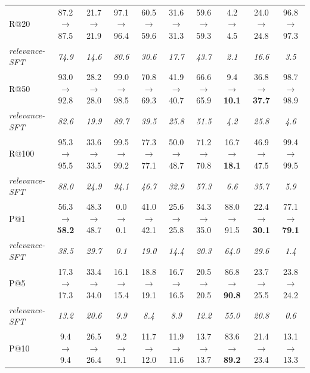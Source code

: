 \begin{table}[H]
{\begin{tabular}{lccccccccc}
R@20 & 87.2 $\rightarrow$ 87.5 & 21.7 $\rightarrow$ 21.9 & 97.1 $\rightarrow$ 96.4 & 60.5 $\rightarrow$ 59.6 & 31.6 $\rightarrow$ 31.3 & 59.6 $\rightarrow$ 59.3 & 4.2 $\rightarrow$ 4.5 & 24.0 $\rightarrow$ 24.8 & 96.8 $\rightarrow$ 97.3 \\
\quad \textit{relevance-SFT} & \textit{74.9} & \textit{14.6} & \textit{80.6} & \textit{30.6} & \textit{17.7} & \textit{43.7} & \textit{2.1} & \textit{16.6} & \textit{3.5} \\
R@50 & 93.0 $\rightarrow$ 92.8 & 28.2 $\rightarrow$ 28.0 & 99.0 $\rightarrow$ 98.5 & 70.8 $\rightarrow$ 69.3 & 41.9 $\rightarrow$ 40.7 & 66.6 $\rightarrow$ 65.9 & 9.4 $\rightarrow$ \textbf{10.1} & 36.8 $\rightarrow$ \textbf{37.7} & 98.7 $\rightarrow$ 98.9 \\
\quad \textit{relevance-SFT} & \textit{82.6} & \textit{19.9} & \textit{89.7} & \textit{39.5} & \textit{25.8} & \textit{51.5} & \textit{4.2} & \textit{25.8} & \textit{4.6} \\
R@100 & 95.3 $\rightarrow$ 95.5 & 33.6 $\rightarrow$ 33.5 & 99.5 $\rightarrow$ 99.2 & 77.3 $\rightarrow$ 77.1 & 50.0 $\rightarrow$ 48.7 & 71.2 $\rightarrow$ 70.8 & 16.7 $\rightarrow$ \textbf{18.1} & 46.9 $\rightarrow$ 47.5 & 99.4 $\rightarrow$ 99.5 \\
\quad \textit{relevance-SFT} & \textit{88.0} & \textit{24.9} & \textit{94.1} & \textit{46.7} & \textit{32.9} & \textit{57.3} & \textit{6.6} & \textit{35.7} & \textit{5.9} \\
P@1 & 56.3 $\rightarrow$ \textbf{58.2} & 48.3 $\rightarrow$ 48.7 & 0.0 $\rightarrow$ 0.1 & 41.0 $\rightarrow$ 42.1 & 25.6 $\rightarrow$ 25.8 & 34.3 $\rightarrow$ 35.0 & 88.0 $\rightarrow$ 91.5 & 22.4 $\rightarrow$ \textbf{30.1} & 77.1 $\rightarrow$ \textbf{79.1} \\
\quad \textit{relevance-SFT} & \textit{38.5} & \textit{29.7} & \textit{0.1} & \textit{19.0} & \textit{14.4} & \textit{20.3} & \textit{64.0} & \textit{29.6} & \textit{1.4} \\
P@5 & 17.3 $\rightarrow$ 17.3 & 33.4 $\rightarrow$ 34.0 & 16.1 $\rightarrow$ 15.4 & 18.8 $\rightarrow$ 19.1 & 16.7 $\rightarrow$ 16.5 & 20.5 $\rightarrow$ 20.5 & 86.8 $\rightarrow$ \textbf{90.8} & 23.7 $\rightarrow$ 25.5 & 23.8 $\rightarrow$ 24.2 \\
\quad \textit{relevance-SFT} & \textit{13.2} & \textit{20.6} & \textit{9.9} & \textit{8.4} & \textit{8.9} & \textit{12.2} & \textit{55.0} & \textit{20.8} & \textit{0.6} \\
P@10 & 9.4 $\rightarrow$ 9.4 & 26.5 $\rightarrow$ 26.4 & 9.2 $\rightarrow$ 9.1 & 11.7 $\rightarrow$ 12.0 & 11.9 $\rightarrow$ 11.6 & 13.7 $\rightarrow$ 13.7 & 83.6 $\rightarrow$ \textbf{89.2} & 21.4 $\rightarrow$ 23.4 & 13.1 $\rightarrow$ 13.3 \\

\end{tabular}}
\end{table}
